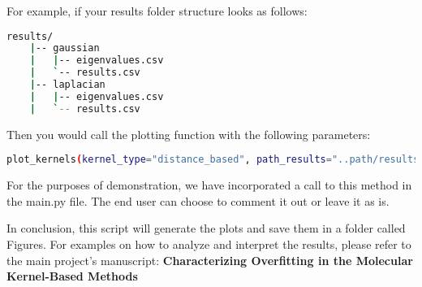 \documentclass{article}
\begin{document}
For example, if your results folder structure looks as follows:
\begin{lstlisting}[language=bash]
    results/
    |-- gaussian
    |   |-- eigenvalues.csv
    |   `-- results.csv
    |-- laplacian
    |   |-- eigenvalues.csv
    |   `-- results.csv
\end{lstlisting}

Then you would call the plotting function with the following parameters:
\begin{lstlisting}[language=bash]
    plot_kernels(kernel_type="distance_based", path_results="..path/results/", regularization=False)
\end{lstlisting}

For the purposes of demonstration, we have incorporated a call to this method in the 
main.py file. The end user can choose to comment it out or leave it as is.

In conclusion, this script will generate the plots and save them in a folder called Figures.
For examples on how to analyze and interpret the results, please refer to the main 
project's manuscript: \textbf{Characterizing Overfitting in the
Molecular Kernel-Based Methods}

\end{document}
